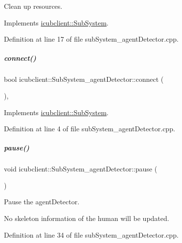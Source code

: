 Clean up resources. 



Implements \hyperlink{group__icubclient__subsystems_af327c56ad0d33aada77f825d96fb47f2}{icubclient\+::\+Sub\+System}.



Definition at line 17 of file sub\+System\+\_\+agent\+Detector.\+cpp.

\mbox{\label{group__icubclient__subsystems_aca0db45f7e3522c954de25f61fd76f7f}} 
\subparagraph{\texorpdfstring{connect()}{connect()}}
{\footnotesize\ttfamily bool icubclient\+::\+Sub\+System\+\_\+agent\+Detector\+::connect (\begin{DoxyParamCaption}{ }\end{DoxyParamCaption})\hspace{0.3cm}{\ttfamily [protected]}, {\ttfamily [virtual]}}



Implements \hyperlink{group__icubclient__subsystems_a5fc84b6e51ec56f91323280b7da52dc8}{icubclient\+::\+Sub\+System}.



Definition at line 4 of file sub\+System\+\_\+agent\+Detector.\+cpp.

\mbox{\label{group__icubclient__subsystems_a0327f12c73a1903ed310069b61d577ea}} 
\subparagraph{\texorpdfstring{pause()}{pause()}}
{\footnotesize\ttfamily void icubclient\+::\+Sub\+System\+\_\+agent\+Detector\+::pause (\begin{DoxyParamCaption}{ }\end{DoxyParamCaption})}



Pause the agent\+Detector. 

No skeleton information of the human will be updated. 

Definition at line 34 of file sub\+System\+\_\+agent\+Detector.\+cpp.

